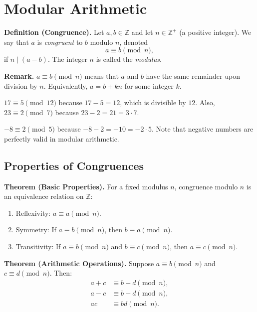 \documentclass[11pt,a4paper]{article}
\begin{document}
\section{Modular Arithmetic}

\textbf{Definition (Congruence).} Let $a, b \in \mathbb{Z}$ and let $n \in \mathbb{Z}^+$ (a positive integer). We say that $a$ is \textit{congruent} to $b$ modulo $n$, denoted
\begin{equation*}
    a \equiv b \pmod{n},
\end{equation*}
if $n \mid (a - b)$. The integer $n$ is called the \textit{modulus}.

\textbf{Remark.} $a \equiv b \pmod{n}$ means that $a$ and $b$ have the same remainder upon division by $n$. Equivalently, $a = b + kn$ for some integer $k$.

\begin{example}
$17 \equiv 5 \pmod{12}$ because $17 - 5 = 12$, which is divisible by $12$. Also, $23 \equiv 2 \pmod{7}$ because $23 - 2 = 21 = 3 \cdot 7$.
\end{example}

\begin{example}
$-8 \equiv 2 \pmod{5}$ because $-8 - 2 = -10 = -2 \cdot 5$. Note that negative numbers are perfectly valid in modular arithmetic.
\end{example}

\subsection{Properties of Congruences}

\textbf{Theorem (Basic Properties).} For a fixed modulus $n$, congruence modulo $n$ is an equivalence relation on $\mathbb{Z}$:
\begin{enumerate}[label=(\roman*)]
    \item Reflexivity: $a \equiv a \pmod{n}$.
    \item Symmetry: If $a \equiv b \pmod{n}$, then $b \equiv a \pmod{n}$.
    \item Transitivity: If $a \equiv b \pmod{n}$ and $b \equiv c \pmod{n}$, then $a \equiv c \pmod{n}$.
\end{enumerate}

\textbf{Theorem (Arithmetic Operations).} Suppose $a \equiv b \pmod{n}$ and $c \equiv d \pmod{n}$. Then:
\begin{align*}
    a + c &\equiv b + d \pmod{n}, \\
    a - c &\equiv b - d \pmod{n}, \\
    ac &\equiv bd \pmod{n}.
\end{align*}
\end{document}
